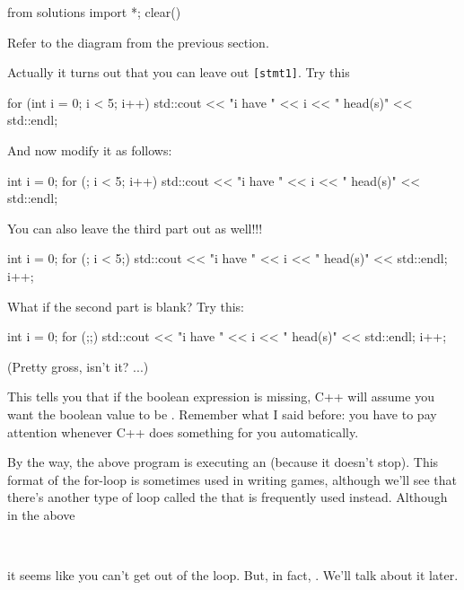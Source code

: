 \begin{python0}
from solutions import *; clear()
\end{python0}

Refer to the diagram from the previous section.

Actually it turns out that you can leave out \texttt{[stmt1]}. Try this
\begin{console}
for (int i = 0; i < 5; i++)
{   
    std::cout << "i have " << i
              << " head(s)"
              << std::endl;
}
\end{console}
And now modify it as follows:
\begin{console}
int i = 0;
for (; i < 5; i++)
{   
    std::cout << "i have " << i
              << " head(s)"
              << std::endl;
}
\end{console}
You can also leave the third part out as well!!!
\begin{console}
int i = 0;
for (; i < 5;)
{   
    std::cout << "i have " << i
              << " head(s)"
              << std::endl;
    i++;
}
\end{console}
What if the second part is blank? Try this:
\begin{console}
int i = 0;
for (;;)
{   
    std::cout << "i have " << i
              << " head(s)"
              << std::endl;
    i++;
}
\end{console}
(Pretty gross, isn't it? ...)

This tells you that if the boolean expression is missing, C++ will
assume you want the boolean value to be . Remember
what I said before: you have to pay attention whenever C++ does
something for you automatically.

By the way, the above program is executing an 
(because it doesn't stop). This format of the for-loop is sometimes used in writing games, although we'll see that there's another type of loop called the
 that is frequently used instead. Although in the above

\\

it seems like you can't get out of the loop. But, in fact, . We'll talk
about it later.

